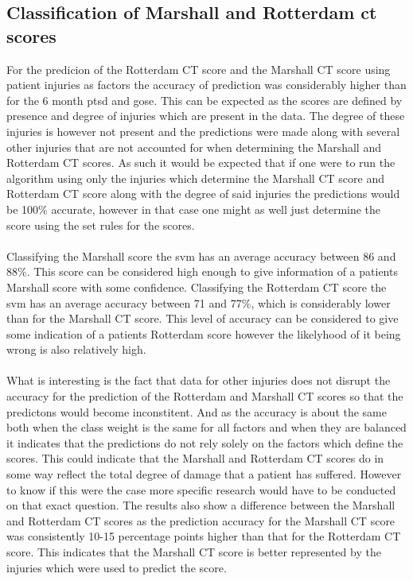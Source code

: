 \documentclass[11pt]{article}
\begin{document}
\subsection{Classification of Marshall and Rotterdam \gls{ct} scores}
For the predicion of the Rotterdam CT score and the Marshall CT score using patient injuries as factors the accuracy of prediction was considerably higher than for the 6 month \gls{ptsd} and \gls{gose}. This can be expected as the scores are defined by presence and degree of injuries which are present in the data. The degree of these injuries is however not present and the predictions were made along with several other injuries that are not accounted for when determining the Marshall and Rotterdam CT scores. As such it would be expected that if one were to run the algorithm using only the injuries which determine the Marshall CT score and Rotterdam CT score along with the degree of said injuries the predictions would be 100\% accurate, however in that case one might as well just determine the score using the set rules for the scores.\\
\\
Classifying the Marshall score the \gls{svm} has an average accuracy between 86 and 88\%. This score can be considered high enough to give information of a patients Marshall score with some confidence. Classifying the Rotterdam CT score the \gls{svm} has an average accuracy between 71 and 77\%, which is considerably lower than for the Marshall CT score. This level of accuracy can be considered to give some indication of a patients Rotterdam score however the likelyhood of it being wrong is also relatively high.\\
\\
What is interesting is the fact that data for other injuries does not disrupt the accuracy for the prediction of the Rotterdam and Marshall CT scores so that the predictons would become inconstitent. And as the accuracy is about the same both when the class weight is the same for all factors and when they are balanced it indicates that the predictions do not rely solely on the factors which define the scores. This could indicate that the Marshall and Rotterdam CT scores do in some way reflect the total degree of damage that a patient has suffered. However to know if this were the case more specific research would have to be conducted on that exact question. The results also show a difference between the Marshall and Rotterdam CT scores as the prediction accuracy for the Marshall CT score was consistently 10-15 percentage points higher than that for the Rotterdam CT score. This indicates that the Marshall CT score is better represented by the injuries which were used to predict the score.\\
\end{document}
